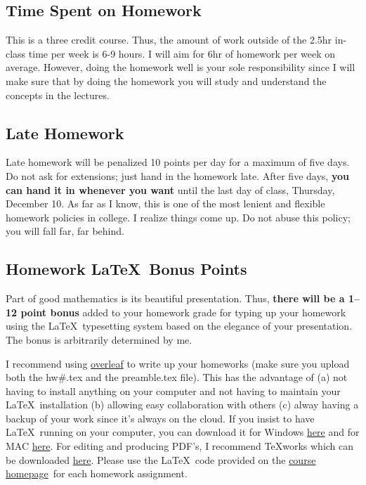 \documentclass[12pt]{article}
\newcommand{\ingreen}[1]{\color{green}\textbf{#1} \color{black}}
\newcommand{\coursewebpage}{\href{https://github.com/kapelner/QC_Math_241_Fall_2017}{course homepage}}
\begin{document}
\subsection*{Time Spent on Homework }

This is a three credit course. Thus, the amount of work outside of the 2.5hr in-class time per week is 6-9 hours. I will aim for 6hr of homework per week on average. However, doing the homework well is your sole responsibility since I will make sure that by doing the homework you will study and understand the concepts in the lectures.

\subsection*{Late Homework}

Late homework will be penalized 10 points per day for a maximum of five days. Do not ask for extensions; just hand in the homework late. After five days, \textbf{you can hand it in whenever you want} until the last day of class, Thursday, December 10. As far as I know, this is one of the most lenient and flexible homework policies in college. I realize things come up. Do not abuse this policy; you will fall far, far behind.

\subsection*{Homework \LaTeX~Bonus Points}

Part of good mathematics is its beautiful presentation. Thus, \ingreen{there will be a 1--12 point bonus} added to your homework grade  for typing up your homework using the \LaTeX ~typesetting system based on the elegance of your presentation. The bonus is arbitrarily determined by me.

I recommend using \href{http://overleaf.com}{overleaf} to write up your homeworks (make sure you upload both the hw\#.tex and the preamble.tex file). This has the advantage of (a) not having to install anything on your computer and not having to maintain your \LaTeX ~installation (b) allowing easy collaboration with others (c) alway having a backup of your work since it's always on the cloud. If you insist to have \LaTeX ~running on your computer, you can download it for Windows \href{http://www.miktex.org/download}{here} and for MAC \href{http://www.tug.org/mactex/}{here}. For editing and producing PDF's, I recommend \TeX works which can be downloaded \href{http://www.tug.org/texworks/#Getting_TeXworks}{here}. Please use the \LaTeX ~code provided on the \coursewebpage ~for each homework assignment. 
\end{document}
